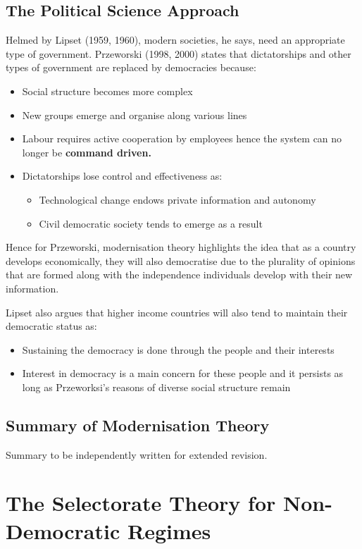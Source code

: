 \documentclass[12pt, letterpaper]{article}
\begin{document}
\subsection{The Political Science Approach}
Helmed by Lipset (1959, 1960), modern societies, he says, need an appropriate type of government. Przeworski (1998, 2000) states that dictatorships and other types of government are replaced by democracies because:
\begin{itemize}
	\item Social structure becomes more complex
	\item New groups emerge and organise along various lines
	\item Labour requires active cooperation by employees hence the system can no longer be \textbf{command driven.}
	\item Dictatorships lose control and effectiveness as:
		\begin{itemize}
			\item Technological change endows private information and autonomy
			\item Civil democratic society tends to emerge as a result
		\end{itemize}
\end{itemize}
Hence for Przeworski, modernisation theory highlights the idea that as a country develops economically, they will also democratise due to the plurality of opinions that are formed along with the independence individuals develop with their new information.

Lipset also argues that higher income countries will also tend to maintain their democratic status as:
\begin{itemize}
	\item Sustaining the democracy is done through the people and their interests
	\item Interest in democracy is a main concern for these people and it persists as long as Przeworksi's reasons of diverse social structure remain
\end{itemize}

\subsection{Summary of Modernisation Theory}
Summary to be independently written for extended revision.

\newpage
\section{The Selectorate Theory for Non-Democratic Regimes}
\end{document}
